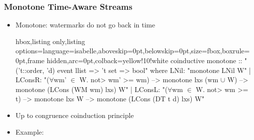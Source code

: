 \documentclass[aspectratio=169,10pt]{beamer}
\begin{document}
\begin{frame}[fragile]
  \frametitle{Monotone Time-Aware Streams}
  \begin{itemize}
    \item Monotone: watermarks do not go back in time
\vspace*{-1ex}
\begin{tcblisting}{hbox,listing only,listing options={language=isabelle,aboveskip=0pt,belowskip=0pt},size=fbox,boxrule=0pt,frame hidden,arc=0pt,colback=yellow!10!white}
coinductive monotone :: "('t::order, 'd) event llist => 't set => bool" where
  LNil: "monotone LNil W"
| LConsR: "($\forall$wm' $\in$ W. \<not> wm' >= wm) --> monotone lxs ({wm} $\cup$ W) -->
   monotone (LCons (WM wm) lxs) W"
| LConsL: "($\forall$wm $\in$ W. \<not> wm >= t) --> monotone lxs W -->
   monotone (LCons (DT t d) lxs) W"
\end{tcblisting}
\vspace*{-1ex}
          \pause
          \item Up to congruence coinduction principle
          \pause
    \item Example:
  \end{itemize}


\end{frame}
\end{document}
